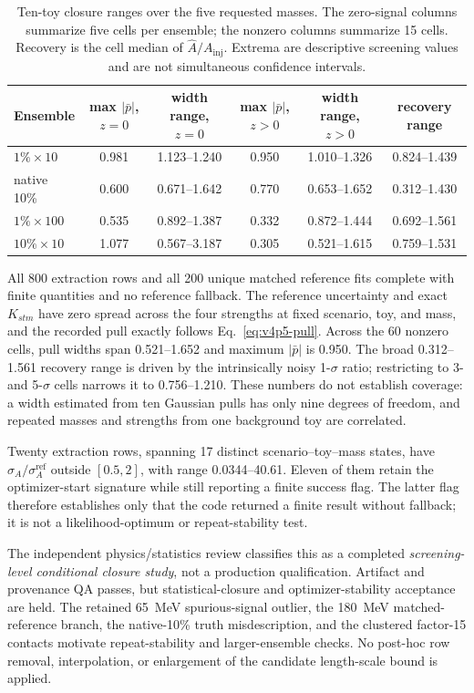 {\begin{table}[p]
\centering
\small
\caption{Ten-toy closure ranges over the five requested masses.  The zero-signal
columns summarize five cells per ensemble; the nonzero columns summarize 15 cells.
Recovery is the cell median of $\widehat A/A_{\mathrm{inj}}$.  Extrema are
descriptive screening values and are not simultaneous confidence intervals.}
\label{tab:v4p5-refmatched-summary}
\begin{tabular}{lccccc}
\toprule
Ensemble & max $|\bar p|$, $z=0$ & width range, $z=0$ &
max $|\bar p|$, $z>0$ & width range, $z>0$ & recovery range \\
\midrule
$1\%\times10$  & 0.981 & 1.123--1.240 & 0.950 & 1.010--1.326 & 0.824--1.439 \\
native 10\%     & 0.600 & 0.671--1.642 & 0.770 & 0.653--1.652 & 0.312--1.430 \\
$1\%\times100$ & 0.535 & 0.892--1.387 & 0.332 & 0.872--1.444 & 0.692--1.561 \\
$10\%\times10$ & 1.077 & 0.567--3.187 & 0.305 & 0.521--1.615 & 0.759--1.531 \\
\bottomrule
\end{tabular}
\end{table}

All 800 extraction rows and all 200 unique matched reference fits complete with
finite quantities and no reference fallback.  The reference uncertainty and exact
$K_{stm}$ have zero spread across the four strengths at fixed scenario, toy, and
mass, and the recorded pull exactly follows Eq.~\eqref{eq:v4p5-pull}.  Across the
60 nonzero cells, pull widths span 0.521--1.652 and maximum $|\bar p|$ is 0.950.
The broad 0.312--1.561 recovery range is driven by the intrinsically noisy 1-$\sigma$
ratio; restricting to 3- and 5-$\sigma$ cells narrows it to 0.756--1.210.  These
numbers do not establish coverage: a width estimated from ten Gaussian pulls has only
nine degrees of freedom, and repeated masses and strengths from one background toy
are correlated.

Twenty extraction rows, spanning 17 distinct scenario--toy--mass states, have
$\widehat\sigma_A/\sigma_A^{\mathrm{ref}}$ outside $[0.5,2]$, with range
0.0344--40.61.  Eleven of them retain the optimizer-start signature while still
reporting a finite success flag.  The latter flag therefore establishes only that
the code returned a finite result without fallback; it is not a likelihood-optimum
or repeat-stability test.

The independent physics/statistics review classifies this as a completed
\emph{screening-level conditional closure study}, not a production qualification.
Artifact and provenance QA passes, but statistical-closure and optimizer-stability
acceptance are held.
The retained 65~MeV spurious-signal outlier, the 180~MeV matched-reference branch,
the native-10\% truth misdescription, and the clustered factor-15 contacts motivate
repeat-stability and larger-ensemble checks.  No post-hoc row removal, interpolation,
or enlargement of the candidate length-scale bound is applied.

}
